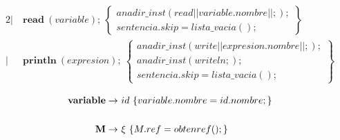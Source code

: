 \documentclass[12pt,a4paper,landscape]{article}
\theoremstyle{mytheor}
\begin{document}
  \begin{alignat*}{2}
   |\ &\textbf{read}\ (variable);\ \begin{Bmatrix} anadir\_inst(read||variable.nombre||;);\\ sentencia.skip=lista\_vacia();\end{Bmatrix}\\
 |\ &\textbf{println} \ (expresion);\  \begin{Bmatrix} anadir\_inst(write||expresion.nombre||;); \\ anadir\_inst(writeln;); \\ sentencia.skip=lista\_vacia(); \end{Bmatrix}\\
 \end{alignat*}
 \begin{alignat*}{2}
     \text{\textbf{variable}} \to\ & id\ \{variable.nombre = id.nombre;\} \\\\
     \text{\textbf{M}} \to\ &\xi\ \{M.ref=obtenref();\}
  \end{alignat*}
\end{document}
